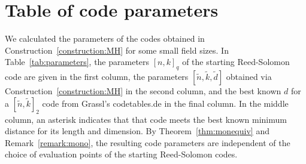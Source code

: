 \documentclass[11pt]{amsart}
\theoremstyle{definition}
\newcommand{\0}{\mathbf{0}}
\begin{document}
\section{Table of code parameters}
\label{sec:table}

We calculated the parameters of the codes obtained in Construction~\ref{construction:MH} for some small field sizes. In Table~\ref{tab:parameters}, the parameters $[n,k]_q$ of the starting Reed-Solomon code are given in the first column, the parameters $[\tilde{n},\tilde{k},\tilde{d}]$ obtained via Construction~\ref{construction:MH} in the second column, and the best known $d$ for a $[\tilde{n},\tilde{k}]_2$ code from Grassl's codetables.de \cite{Grassl:codetables} in the final column. In the middle column, an asterisk indicates that that code meets the best known minimum distance for its length and dimension. By Theorem~\ref{thm:monequiv} and Remark~\ref{remark:mono}, the resulting code parameters are independent of the choice of evaluation points of the starting Reed-Solomon codes.
\end{document}
